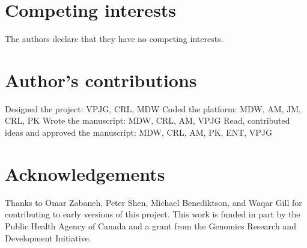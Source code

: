 \documentclass[doublespacing, linenumbers]{bmcart}
\begin{document}

\begin{backmatter}

\section*{Competing interests}
  The authors declare that they have no competing interests.

\section*{Author's contributions}
Designed the project: VPJG, CRL, MDW
Coded the platform: MDW, AM, JM, CRL, PK
Wrote the manuscript: MDW, CRL, AM, VPJG
Read, contributed ideas and approved the manuscript: MDW, CRL, AM, PK, ENT, VPJG

\section*{Acknowledgements}
Thanks to Omar Zabaneh, Peter Shen, Michael Benediktson, and Waqar Gill for contributing to early versions of this project.  This work is funded in part by the Public Health Agency of Canada and a grant from the Genomics Research and Development Initiative.



\end{backmatter}
\end{document}

